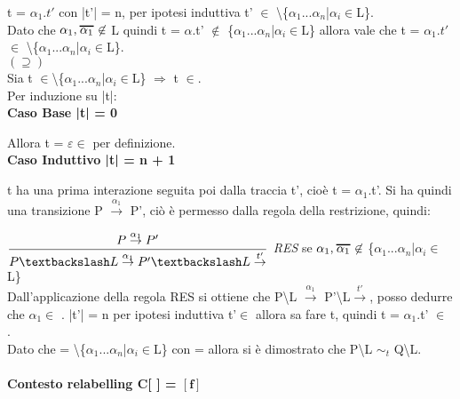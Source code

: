 	t = $\alpha_{1}.t'$ con |t'| = n, per ipotesi induttiva t' $\in$ \textbackslash \{$\alpha_{1}$...$\alpha_{n}$|$\alpha_{i}\in$L\}. \\
	Dato che $\alpha_{1}, \Overline[1pt]{\alpha_{1}} \not\in$ L quindi t = $\alpha$.t' $\not \in$ \{$\alpha_{1}$...$\alpha_{n}$|$\alpha_{i}\in$L\} allora vale che t = $\alpha_{1}.t'$ $\in$ \textbackslash \{$\alpha_{1}$...$\alpha_{n}$|$\alpha_{i}\in$L\}.\\


$(\supseteq)$\\

Sia  t $\in$\textbackslash\{$\alpha_{1}$...$\alpha_{n}$|$\alpha_{i}\in$L\} $\Rightarrow$ t $\in$.   \\
Per induzione su |t|:
\\

\textbf{Caso Base |t| = 0}

Allora t = $\varepsilon \in$  per definizione.
\\

\textbf{Caso Induttivo |t| = n + 1}

t ha una prima interazione seguita poi dalla traccia t', cioè t = $\alpha_{1}$.t'. Si ha quindi una transizione P $\overset{\alpha_{1}}\rightarrow$ P', ciò è permesso dalla regola della restrizione, quindi:

$\dfrac{P \overset{\alpha_{1}}\rightarrow P'}{P\textbackslash L \overset{\alpha_{1}}\rightarrow P'\textbackslash L\overset{t'}\rightarrow}$ \textit{RES} se $\alpha_{1}, \Overline[1pt]{\alpha_{1}} \not\in$ \{$\alpha_{1}$...$\alpha_{n}$|$\alpha_{i}\in$L\}\\


Dall'applicazione della regola RES si ottiene che P\textbackslash L $\overset{\alpha_{1}}\rightarrow$ P'\textbackslash L$\overset{t'}\rightarrow$, posso dedurre che $\alpha_{1} \in$ . |t'| = n per ipotesi induttiva t'$\in$  allora  sa fare t, quindi t = $\alpha_{1}$.t' $\in$ .\\

Dato che  = \textbackslash \{$\alpha_{1}$...$\alpha_{n}$|$\alpha_{i}\in$L\} con  =   allora si è dimostrato che  P\textbackslash L $\sim_{t}$ Q\textbackslash L.

\paragraph{Contesto relabelling  C[ ] = $\mathbf{[f]}$ } \mbox{}

